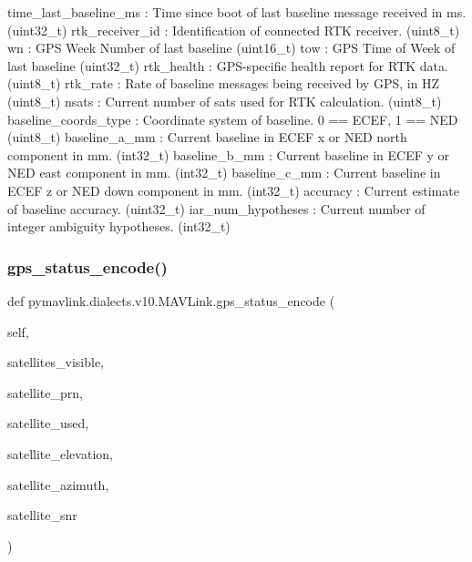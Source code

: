 \begin{DoxyVerb}
\begin{DoxyVerb}
\begin{DoxyVerb}
time_last_baseline_ms        : Time since boot of last baseline message received in ms. (uint32_t)
rtk_receiver_id           : Identification of connected RTK receiver. (uint8_t)
wn                        : GPS Week Number of last baseline (uint16_t)
tow                       : GPS Time of Week of last baseline (uint32_t)
rtk_health                : GPS-specific health report for RTK data. (uint8_t)
rtk_rate                  : Rate of baseline messages being received by GPS, in HZ (uint8_t)
nsats                     : Current number of sats used for RTK calculation. (uint8_t)
baseline_coords_type        : Coordinate system of baseline. 0 == ECEF, 1 == NED (uint8_t)
baseline_a_mm             : Current baseline in ECEF x or NED north component in mm. (int32_t)
baseline_b_mm             : Current baseline in ECEF y or NED east component in mm. (int32_t)
baseline_c_mm             : Current baseline in ECEF z or NED down component in mm. (int32_t)
accuracy                  : Current estimate of baseline accuracy. (uint32_t)
iar_num_hypotheses        : Current number of integer ambiguity hypotheses. (int32_t)\end{DoxyVerb}
 \mbox{\label{classpymavlink_1_1dialects_1_1v10_1_1MAVLink_a66cec6328cd99817e8aa5a8f6cd44f28}} 
\subsubsection{\texorpdfstring{gps\+\_\+status\+\_\+encode()}{gps\_status\_encode()}}
{\footnotesize\ttfamily def pymavlink.\+dialects.\+v10.\+M\+A\+V\+Link.\+gps\+\_\+status\+\_\+encode (\begin{DoxyParamCaption}\item[{}]{self,  }\item[{}]{satellites\+\_\+visible,  }\item[{}]{satellite\+\_\+prn,  }\item[{}]{satellite\+\_\+used,  }\item[{}]{satellite\+\_\+elevation,  }\item[{}]{satellite\+\_\+azimuth,  }\item[{}]{satellite\+\_\+snr }\end{DoxyParamCaption})}


\end{DoxyVerb}
\end{DoxyVerb}
